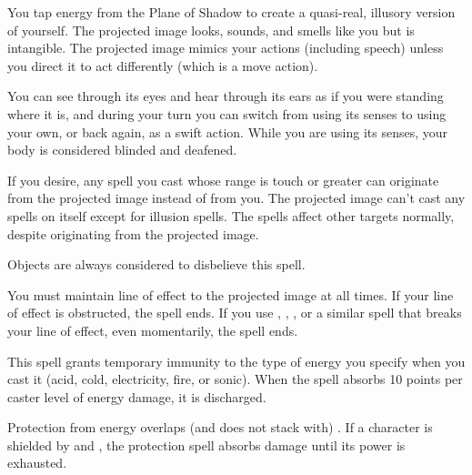 \spellrng{\rngmed}
\spelldur{\durshort \dismissable}
\begin{spelleffect}
    You tap energy from the Plane of Shadow to create a quasi-real, illusory version of yourself. The projected image looks, sounds, and smells like you but is intangible. The projected image mimics your actions (including speech) unless you direct it to act differently (which is a move action).
    \par You can see through its eyes and hear through its ears as if you were standing where it is, and during your turn you can switch from using its senses to using your own, or back again, as a swift action. While you are using its senses, your body is considered blinded and deafened.
    \par If you desire, any spell you cast whose range is touch or greater can originate from the projected image instead of from you. The projected image can't cast any spells on itself except for illusion spells. The spells affect other targets normally, despite originating from the projected image.
\end{spelleffect}
\begin{spellnotes}
    Objects are always considered to disbelieve this spell.
    \par You must maintain line of effect to the projected image at all times. If your line of effect is obstructed, the spell ends. If you use , , , or a similar spell that breaks your line of effect, even momentarily, the spell ends.
\end{spellnotes}

\begin{spelleffect}
    This spell grants temporary immunity to the type of energy you specify when you cast it (acid, cold, electricity, fire, or sonic). When the spell absorbs 10 points per caster level of energy damage, it is discharged.
\end{spelleffect}
\begin{spellnotes}
    Protection from energy overlaps (and does not stack with) . If a character is shielded by  and , the protection spell absorbs damage until its power is exhausted.
\end{spellnotes}

